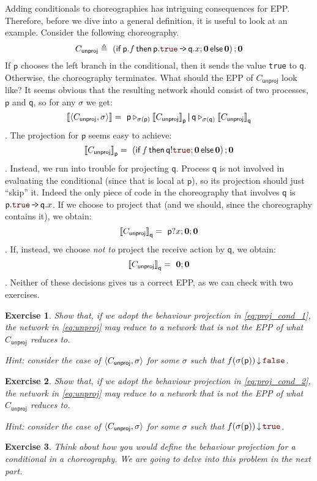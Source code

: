 \documentclass[a4paper,12pt]{article}
\newtheorem{exercise}{Exercise}
\newcommand*{\pp}{\ensuremath{\mathop{\boldsymbol{|}}}}
\newcommand*{\m}[1]{\ensuremath{\mathsf{#1}}}
\newcommand*{\pid}[1]{\m{#1}}
\newcommand*{\com}[2]{\ensuremath{#1 \, \mbox{\tt{-\!>}}\, #2}}
\newcommand*{\nil}{\ensuremath{\boldsymbol{0}}\xspace}
\newcommand*{\procv}[3]{\ensuremath{{#1} \triangleright_{#2} #3}}
\newcommand*{\psendf}[2]{\ensuremath{{#1}!#2}}
\newcommand*{\precvf}[2]{\ensuremath{{#1}?#2}}
\newcommand{\defeq}{\triangleq}
\newcommand*{\cond}[3]{\m{if}\, #1 \, \m{then} \, #2 \, \m{else} \, #3}
\newcommand*{\valuefnt}[1]{{\color{literal}\texttt{#1}}}
\newcommand*{\trueval}{\valuefnt{true}\xspace}
\newcommand*{\falseval}{\valuefnt{false}\xspace}
\newcommand*{\eval}{\ensuremath{\mathop{\downarrow}}\xspace}
\begin{document}
Adding conditionals to choreographies has intriguing consequences for EPP. Therefore, before we 
dive into a general definition, it is useful to look at an example.
Consider the following choreography.
\[
C_{\m{unproj}} \defeq\ \left( \cond{\pid p.f}{\com{\pid p.\trueval}{\pid q.x};\nil}{\nil}\right) ; 
\nil
\]
If \pid p chooses the left branch in the conditional, then it sends the value \trueval to \pid q. 
Otherwise, the choreography terminates.
What should the EPP of $C_{\m{unproj}}$ look like? It seems obvious that the resulting network 
should consist of two processes, \pid p and \pid q, so for any $\sigma$ we get:
\begin{equation}
\label{eq:unproj}
\epp{\rc{C_{\m{unproj}}}[\sigma]} = \ 
\procv{\pid p}{\sigma(\pid p)}{\epp{C_{\m{unproj}}}[\pid p]}
\pp
\procv{\pid q}{\sigma(\pid q)}{\epp{C_{\m{unproj}}}[\pid q]}
\end{equation}
. The projection for \pid p seems easy to achieve:
\[
\epp{C_{\m{unproj}}}[\pid p] = \
\left(\cond{f}{\psendf{\pid q}{\trueval};\nil}{\nil}\right);\nil
\]
. Instead, we run into trouble for projecting \pid q. Process \pid q is not involved in evaluating 
the conditional (since that is local at \pid p), so its projection should just ``skip'' it. Indeed 
the only piece of code in the choreography that involves \pid q is $\com{\pid p.\trueval}{\pid 
q.x}$. If we choose to project that (and we should, since the choreography contains it), 
we obtain:
\begin{equation}
\label{eq:proj_cond_1}
\epp{C_{\m{unproj}}}[\pid q] = \
\precvf{\pid p}{x};\nil;\nil
\end{equation}
. If, instead, we choose \emph{not to} project the receive action by \pid q, we obtain:
\begin{equation}
\label{eq:proj_cond_2}
\epp{C_{\m{unproj}}}[\pid q] = \
\nil;\nil
\end{equation}.
Neither of these decisions gives us a correct EPP, as we can check with two exercises.

\begin{exercise}
Show that, if we adopt the behaviour projection in \cref{eq:proj_cond_1}, the network in 
\cref{eq:unproj} may reduce to a network that is not the EPP of what $C_{\m{unproj}}$ reduces to.

Hint: consider the case of $\rc{C_{\m{unproj}}}[\sigma]$ for some $\sigma$ such that $f(\sigma(\pid 
p)) \eval \falseval$.
\end{exercise}

\begin{exercise}
Show that, if we adopt the behaviour projection in \cref{eq:proj_cond_2}, the network in 
\cref{eq:unproj} may reduce to a network that is not the EPP of what $C_{\m{unproj}}$ reduces to.

Hint: consider the case of $\rc{C_{\m{unproj}}}[\sigma]$ for some $\sigma$ such that $f(\sigma(\pid 
p)) \eval \trueval$.
\end{exercise}

\begin{exercise}
Think about how you would define the behaviour projection for a conditional in a choreography. We 
are going to delve into this problem in the next part.
\end{exercise}


% 
% 
% 
\end{document}

